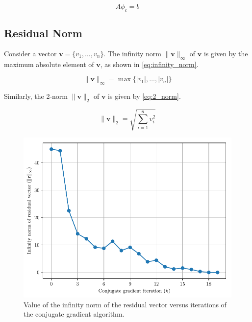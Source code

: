 \documentclass[a4paper,titlepage]{article}
\begin{document}
	\begin{equation} \label{eq:fd}
		A\phi_c = b
	\end{equation}
	
	\subsection{Residual Norm}
	
	Consider a vector $\textbf{v} = \{v_1, \ldots, v_n\}$. The infinity norm $\|\textbf{v}\|_\infty$ of $\textbf{v}$ is given by the maximum absolute element of $\textbf{v}$, as shown in \cref{eq:infinity_norm}.
	
	\begin{equation} \label{eq:infinity_norm}
		\|\textbf{v}\|_\infty = \max\{|v_1|, \ldots, |v_n|\}
	\end{equation}
	
	Similarly, the 2-norm $\|\textbf{v}\|_2$ of $\textbf{v}$ is given by \cref{eq:2_norm}.
	
	\begin{equation} \label{eq:2_norm}
		\|\textbf{v}\|_2 = \sqrt{\sum_{i = 1}^{n} v_i^2}
	\end{equation}
	
	\begin{figure}[!htb]
		\centering
		\includegraphics[width=\columnwidth]{plots/q3c_infinity.pdf}
		\caption
		{Value of the infinity norm of the residual vector versus iterations of the conjugate gradient algorithm.}
		\label{fig:q3c_infinity}
	\end{figure}
	
\end{document}
